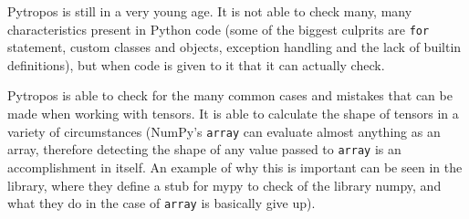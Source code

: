 


Pytropos is still in a very young age. It is not able to check many,
many characteristics present in Python code (some of the biggest
culprits are \texttt{for} statement, custom classes and objects,
exception handling and the lack of builtin definitions), but when code
is given to it that it can actually check.

Pytropos is able to check for the many common cases and mistakes that
can be made when working with tensors. It is able to calculate the shape
of tensors in a variety of circumstances (NumPy's \texttt{array} can
evaluate almost anything as an array, therefore detecting the shape of
any value passed to \texttt{array} is an accomplishment in itself. An
example of why this is important can be seen in the library{}, where they define a stub for mypy to check of
the library numpy, and what they do in the case of \texttt{array} is
basically give up).

